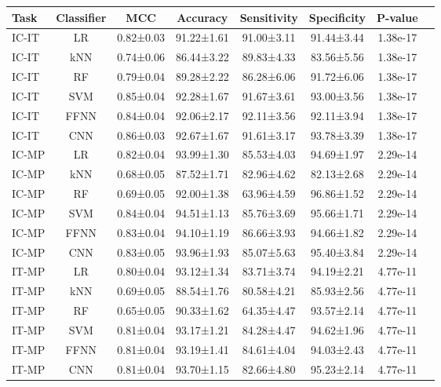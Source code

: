 \begin{tabular}{lccccccc}
\toprule
 Task & Classifier &       MCC &   Accuracy & Sensitivity & Specificity &  P-value \\
\midrule
IC-IT &         LR & 0.82±0.03 & 91.22±1.61 &  91.00±3.11 &  91.44±3.44 & 1.38e-17 \\
IC-IT &        kNN & 0.74±0.06 & 86.44±3.22 &  89.83±4.33 &  83.56±5.56 & 1.38e-17 \\
IC-IT &         RF & 0.79±0.04 & 89.28±2.22 &  86.28±6.06 &  91.72±6.06 & 1.38e-17 \\
IC-IT &        SVM & 0.85±0.04 & 92.28±1.67 &  91.67±3.61 &  93.00±3.56 & 1.38e-17 \\
IC-IT &       FFNN & 0.84±0.04 & 92.06±2.17 &  92.11±3.56 &  92.11±3.94 & 1.38e-17 \\
IC-IT &        CNN & 0.86±0.03 & 92.67±1.67 &  91.61±3.17 &  93.78±3.39 & 1.38e-17 \\
IC-MP &         LR & 0.82±0.04 & 93.99±1.30 &  85.53±4.03 &  94.69±1.97 & 2.29e-14 \\
IC-MP &        kNN & 0.68±0.05 & 87.52±1.71 &  82.96±4.62 &  82.13±2.68 & 2.29e-14 \\
IC-MP &         RF & 0.69±0.05 & 92.00±1.38 &  63.96±4.59 &  96.86±1.52 & 2.29e-14 \\
IC-MP &        SVM & 0.84±0.04 & 94.51±1.13 &  85.76±3.69 &  95.66±1.71 & 2.29e-14 \\
IC-MP &       FFNN & 0.83±0.04 & 94.10±1.19 &  86.66±3.93 &  94.66±1.82 & 2.29e-14 \\
IC-MP &        CNN & 0.83±0.05 & 93.96±1.93 &  85.07±5.63 &  95.40±3.84 & 2.29e-14 \\
IT-MP &         LR & 0.80±0.04 & 93.12±1.34 &  83.71±3.74 &  94.19±2.21 & 4.77e-11 \\
IT-MP &        kNN & 0.69±0.05 & 88.54±1.76 &  80.58±4.21 &  85.93±2.56 & 4.77e-11 \\
IT-MP &         RF & 0.65±0.05 & 90.33±1.62 &  64.35±4.47 &  93.57±2.14 & 4.77e-11 \\
IT-MP &        SVM & 0.81±0.04 & 93.17±1.21 &  84.28±4.47 &  94.62±1.96 & 4.77e-11 \\
IT-MP &       FFNN & 0.81±0.04 & 93.19±1.41 &  84.61±4.04 &  94.03±2.43 & 4.77e-11 \\
IT-MP &        CNN & 0.81±0.04 & 93.70±1.15 &  82.66±4.80 &  95.23±2.14 & 4.77e-11 \\
\bottomrule
\end{tabular}
